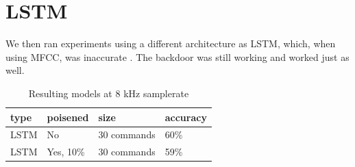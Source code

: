 \documentclass{report}
\theoremstyle{definition}
\theoremstyle{remark}
\begin{document}
\section{LSTM}
We then ran experiments using a different architecture as LSTM, which, when using MFCC, was inaccurate . The backdoor was still working and worked just as well.

\begin{table}[!hbt]
\centering
\begin{tabular}{|l|l|l|l|}
\hline
type & poisened & size & accuracy \\ \hline
LSTM & No  &  30 commands  &  60\% \\ \hline
LSTM & Yes, 10\%  &  30 commands  & 59\%          \\ \hline
\end{tabular}
\caption{Resulting models at 8 kHz samplerate}
\end{table}

\end{document}
